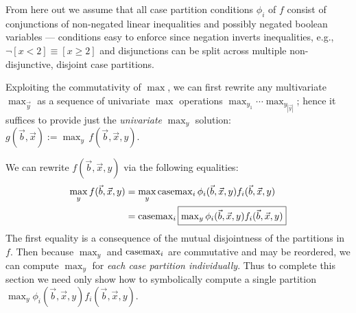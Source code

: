 From here out we assume that all case partition conditions $\phi_i$ of
$f$ consist of conjunctions of non-negated linear inequalities and
possibly negated boolean variables --- conditions easy to enforce
since 
negation
inverts inequalities, e.g., $\neg [x < 2] \equiv [x \geq 2]$
and disjunctions can be split across multiple non-disjunctive, 
disjoint case partitions.

Exploiting the commutativity of $\max$, we can first
rewrite any multivariate $\max_{\vec{y}}$ as a sequence of univariate
$\max$ operations $\max_{y_1} \cdots \max_{y_{|\vec{y}|}}$; hence it
suffices to provide just the \emph{univariate} $\max_y$ solution:
$g(\vec{b},\vec{x}) := \max_{y} \, f(\vec{b},\vec{x},y)$.

We can rewrite $f(\vec{b},\vec{x},y)$ via 
the following equalities:
{\footnotesize
\begin{align}
\max_y f(\vec{b},\vec{x},y) & = 
\max_y \mathrm{casemax}_i \, \phi_i(\vec{b},\vec{x},y) f_i(\vec{b},\vec{x},y) \nonumber \\
& = \mathrm{casemax}_i \, \fbox{$\max_y \phi_i(\vec{b},\vec{x},y) f_i(\vec{b},\vec{x},y)$} \label{eq:casemax_max}
\end{align}}
The first equality is a consequence of the mutual 
disjointness of the partitions in $f$.  Then because 
$\max_y$ and $\mathrm{casemax}_i$ are commutative and may be reordered,
we can compute $\max_y$ for \emph{each case partition
individually}.  Thus to complete this section we need only
show how to symbolically compute a single partition 
$\max_y \phi_i(\vec{b},\vec{x},y) f_i(\vec{b},\vec{x},y)$.

